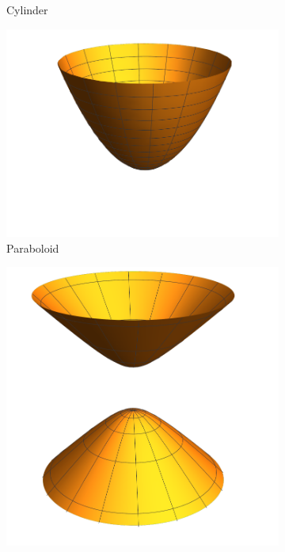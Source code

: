 \begin{figure}[htp]
\begin{subfigure}{0.2\textwidth}
    \caption{Cylinder}
\end{subfigure}
\begin{subfigure}{0.4\textwidth}
    \centering
    \includegraphics[width=\textwidth]{picture/week4/paraboloid.pdf}
    \caption{Paraboloid}
\end{subfigure}
\begin{subfigure}{0.3\textwidth}
    \centering
    \includegraphics[width=\textwidth]{picture/week4/hyperboloid.pdf}

\end{subfigure}
\end{figure}
